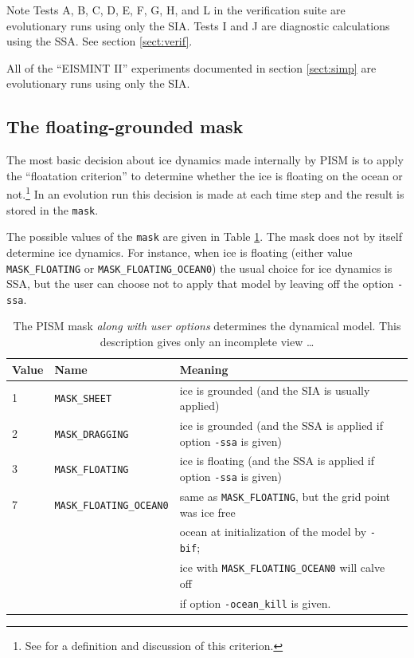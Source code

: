\documentclass[11pt,final]{amsart}
\renewcommand{\t}[1]{\texttt{#1}}
\begin{document}
Note Tests A, B, C, D, E, F, G, H, and L in the verification suite are evolutionary runs using only the SIA.  Tests I and J are diagnostic calculations using the SSA.  See section \ref{sect:verif}.

All of the ``EISMINT II'' experiments documented in section \ref{sect:simp} are evolutionary runs using only the SIA.


\subsection{The floating-grounded mask} \label{subsect:mask}  The most basic decision about ice dynamics made internally by PISM is to apply the ``floatation criterion'' to determine whether the ice is floating on the ocean or not.\footnote{See \cite{WeisGreveHutter} for a definition and discussion of this criterion.}  In an evolution run this decision is made at each time step and the result is stored in the \t{mask}.

The possible values of the \t{mask} are given in Table \ref{tab:maskvals}.  The mask does not by itself determine ice dynamics.  For instance, when ice is floating (either value \verb|MASK_FLOATING| or \verb|MASK_FLOATING_OCEAN0|) the usual choice for ice dynamics is SSA, but the user can choose not to apply that model by leaving off the option \verb|-ssa|.

\begin{table}[ht]
\caption{The PISM mask \emph{along with user options} determines the dynamical model.  This description gives only an incomplete view \dots}\label{tab:maskvals} 
\small
\begin{tabular}{@{}llll}\hline
\textbf{Value} & \textbf{Name} & \textbf{Meaning}\\ \hline
1 & \verb|MASK_SHEET| & ice is grounded (and the SIA is usually applied) \\
2 & \verb|MASK_DRAGGING| & ice is grounded (and the SSA is applied if option \verb|-ssa| is given) \\
3 & \verb|MASK_FLOATING| & ice is floating (and the SSA is applied if option \verb|-ssa| is given) \\
7 & \verb|MASK_FLOATING_OCEAN0| & same as \verb|MASK_FLOATING|, but the grid point was ice free   \\
 & & ocean at initialization of the model by \verb|-bif|;  \\
 & & ice with \verb|MASK_FLOATING_OCEAN0| will calve off  \\
 & & if option \verb|-ocean_kill| is given.\\
\hline\end{tabular}
\normalsize
\end{table}
\end{document}
